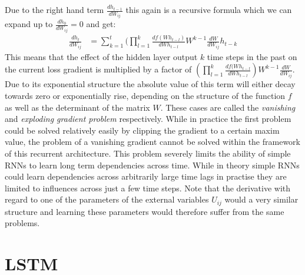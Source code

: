 Due to the right hand term $\frac{dh_{t-1}}{dW_{ij}}$ this again is a recursive formula which we can expand up to $ \frac{dh_{0}}{dW_{ij}} = 0$ and get:
\begin{align*}
\frac{dh_t}{dW_{ij}} &= \sum_{k = 1}^t( \prod_{l = 1}^k \frac{df(Wh_{t-l})}{dWh_{t-l}} W^{k-1} \frac{dW}{dW_{ij}} h_{t-k}
\end{align*}
This means that the effect of the hidden layer output $k$ time steps in the past on the current loss gradient is multiplied by a factor of $(\prod_{l = 1}^k \frac{df(Wh_{t-l}}{dWh_{t-l}}) W^{k-1}\frac{dW}{dW_{ij}}$. Due to its exponential structure the absolute value of this term  will either decay towards zero or exponentially rise, depending on the structure of the function $f$ as well as the determinant of the matrix $W$. These cases are called the \textit{vanishing} and \textit{exploding gradient problem} respectively. While in practice the first problem could be solved relatively easily by clipping the gradient to a certain maxim value, the problem of a vanishing gradient cannot be solved within the framework of this recurrent architecture. This problem severely limits the ability of simple RNNs to learn long term dependencies across time. While in theory simple RNNs could learn dependencies across arbitrarily large time lags in practise they are limited to influences across just a few time steps. Note that the derivative with regard to one of the parameters of the external variables $U_{ij}$ would a very similar structure and learning these parameters would therefore suffer from the same problems.


\section{LSTM}


